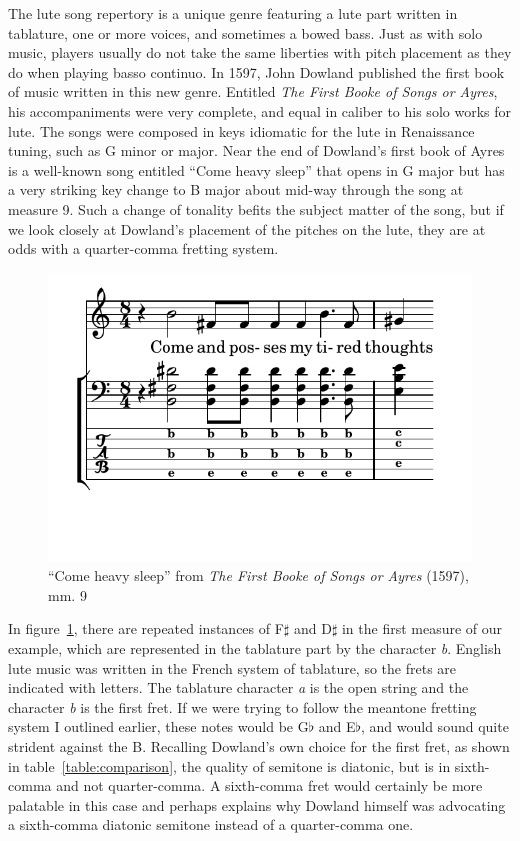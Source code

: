 The lute song repertory is a unique genre featuring a lute part written in tablature, one or more
voices, and sometimes a bowed bass. Just as with solo music, players usually do not take the same
liberties with pitch placement as they do when playing basso continuo. In 1597, John Dowland published the
first book of music written in this new genre. Entitled \textit{The First Booke of Songs or Ayres},
his accompaniments were very complete, and equal in caliber to his solo works for lute. The songs
were composed in keys idiomatic for the lute in Renaissance tuning, such as G minor or major. Near the
end of Dowland's first book of Ayres is a well-known song entitled ``Come heavy sleep'' that opens
in G major but has a very striking key change to B major about mid-way through the song at measure 9.
Such a change of tonality befits the subject matter of the song, but if we look closely at
Dowland's placement of the pitches on the lute, they are at odds with a quarter-comma fretting
system.
\begin{figure}[h]
\centering
\includegraphics{examples/come.pdf}
\caption{``Come heavy sleep'' from \textit{The First Booke of Songs or Ayres} (1597), mm. 9}
\label{dowland-come}
\end{figure}
In figure~\ref{dowland-come}, there are repeated instances of F$\sharp$ and D$\sharp$ in the
first measure of our example, which are represented in the tablature part by the character
\textit{b}. English lute music was written in the French system of tablature, so the
frets are indicated with letters. The tablature character \textit{a} is the open
string and the character \textit{b} is the first fret. If we were trying to follow the
meantone fretting system I outlined earlier, these notes would be G$\flat$ and E$\flat$,
and would sound quite strident against the B. Recalling Dowland's own choice for the
first fret, as shown in table~\ref{table:comparison}, the quality of semitone is diatonic,
but is in sixth-comma and not quarter-comma. A sixth-comma fret would certainly be more
palatable in this case and perhaps explains why Dowland himself was advocating a sixth-comma
diatonic semitone instead of a quarter-comma one.

